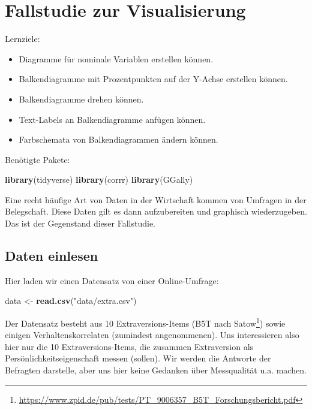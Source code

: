 \documentclass[12pt,ngerman,]{book}
\makeatletter
\newenvironment{Shaded}{\begin{snugshade}}{\end{snugshade}}
\newcommand{\KeywordTok}[1]{\textcolor[rgb]{0.13,0.29,0.53}{\textbf{{#1}}}}
\newcommand{\StringTok}[1]{\textcolor[rgb]{0.31,0.60,0.02}{{#1}}}
\newcommand{\NormalTok}[1]{{#1}}
\providecommand{\tightlist}{%
  \setlength{\itemsep}{0pt}\setlength{\parskip}{0pt}}
\let\rmarkdownfootnote\footnote%
\def\footnote{\protect\rmarkdownfootnote}
\newenvironment{kframe}{%
\medskip{}
\setlength{\fboxsep}{.8em}
 \def\at@end@of@kframe{}%
 \ifinner\ifhmode%
  \def\at@end@of@kframe{\end{minipage}}%
  \begin{minipage}{\columnwidth}%
 \fi\fi%
 \def\FrameCommand##1{\hskip\@totalleftmargin \hskip-\fboxsep
 \colorbox{shadecolor}{##1}\hskip-\fboxsep
     \hskip-\linewidth \hskip-\@totalleftmargin \hskip\columnwidth}%
 \MakeFramed {\advance\hsize-\width
   \@totalleftmargin\z@ \linewidth\hsize
   \@setminipage}}%
 {\par\unskip\endMakeFramed%
 \at@end@of@kframe}
\renewenvironment{Shaded}{\begin{kframe}}{\end{kframe}}
\theoremstyle{definition}
\theoremstyle{definition}
\theoremstyle{remark}
\let\BeginKnitrBlock\begin \let\EndKnitrBlock\end
\makeatother
\begin{document}
\chapter{Fallstudie zur
Visualisierung}\label{fallstudie-zur-visualisierung}

\BeginKnitrBlock{rmdcaution}
Lernziele:

\begin{itemize}
\tightlist
\item
  Diagramme für nominale Variablen erstellen können.
\item
  Balkendiagramme mit Prozentpunkten auf der Y-Achse erstellen können.
\item
  Balkendiagramme drehen können.
\item
  Text-Labels an Balkendiagramme anfügen können.
\item
  Farbschemata von Balkendiagrammen ändern können.
\end{itemize}
\EndKnitrBlock{rmdcaution}

Benötigte Pakete:

\begin{Shaded}
\begin{Highlighting}[]
\KeywordTok{library}\NormalTok{(tidyverse)}
\KeywordTok{library}\NormalTok{(corrr)}
\KeywordTok{library}\NormalTok{(GGally)}
\end{Highlighting}
\end{Shaded}

Eine recht häufige Art von Daten in der Wirtschaft kommen von Umfragen
in der Belegschaft. Diese Daten gilt es dann aufzubereiten und graphisch
wiederzugeben. Das ist der Gegenstand dieser Fallstudie.

\section{Daten einlesen}\label{daten-einlesen}

Hier laden wir einen Datensatz von einer Online-Umfrage:

\begin{Shaded}
\begin{Highlighting}[]
\NormalTok{data <-}\StringTok{ }\KeywordTok{read.csv}\NormalTok{(}\StringTok{"data/extra.csv"}\NormalTok{)}
\end{Highlighting}
\end{Shaded}

Der Datensatz besteht aus 10 Extraversions-Items (B5T nach
Satow\footnote{\url{https://www.zpid.de/pub/tests/PT_9006357_B5T_Forschungsbericht.pdf}})
sowie einigen Verhaltenskorrelaten (zumindest angenommenen). Uns
interessieren also hier nur die 10 Extraversions-Items, die zusammen
Extraversion als Persönlichkeitseigenschaft messen (sollen). Wir werden
die Antworte der Befragten darstelle, aber uns hier keine Gedanken über
Messqualität u.a. machen.
\end{document}
